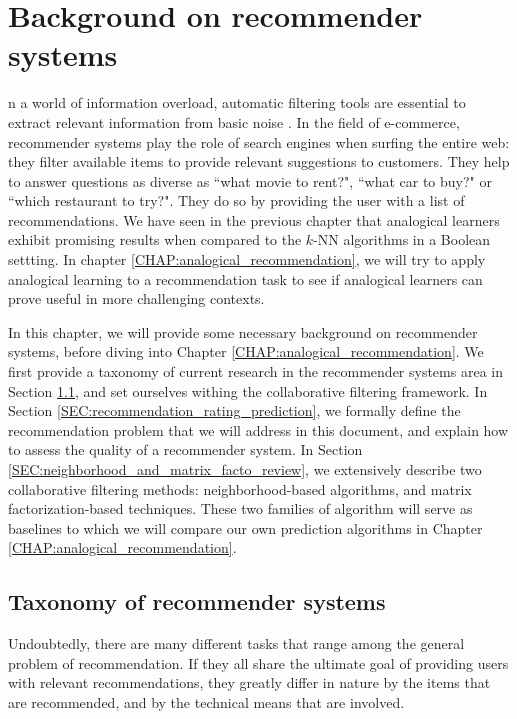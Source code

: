 \chapter{Background on recommender systems}

n a world of information overload, automatic filtering tools are
essential to extract relevant information from basic noise
\cite{RecoSystemHandbook,AdoTuzIEEE2005}. In the field of e-commerce,
recommender systems play the role of search engines when surfing the entire
web: they filter available items to provide relevant suggestions to customers.
They help to answer questions as diverse as ``what movie to rent?", ``what car
to buy?" or ``which restaurant to try?". They do so by providing the user with
a list of recommendations. We have seen in the previous chapter that analogical
learners exhibit promising results when compared to the $k$-NN algorithms in a
Boolean settting. In chapter \ref{CHAP:analogical_recommendation}, we will try
to apply analogical learning to a recommendation task to see if analogical
learners can prove useful in more challenging contexts.

In this chapter, we will provide some necessary background on recommender
systems, before diving into Chapter \ref{CHAP:analogical_recommendation}. We
first provide a taxonomy of current research in the recommender systems area in
Section \ref{SEC:taxonomy_rec_sys}, and set ourselves withing the collaborative filtering
framework. In Section \ref{SEC:recommendation_rating_prediction}, we formally
define the recommendation problem that we will address in this document, and
explain how to assess the quality of a recommender system. In Section
\ref{SEC:neighborhood_and_matrix_facto_review}, we extensively describe two
collaborative filtering methods: neighborhood-based algorithms, and matrix
factorization-based techniques. These two families of algorithm will serve as
baselines to which we will compare our own prediction algorithms in Chapter
\ref{CHAP:analogical_recommendation}.

\section{Taxonomy of recommender systems}
\label{SEC:taxonomy_rec_sys}

Undoubtedly, there are many different tasks that range among the general problem
of recommendation. If they all share the ultimate goal of providing users with
relevant recommendations, they greatly differ in nature by the items that are
recommended, and by the technical means that are involved.

